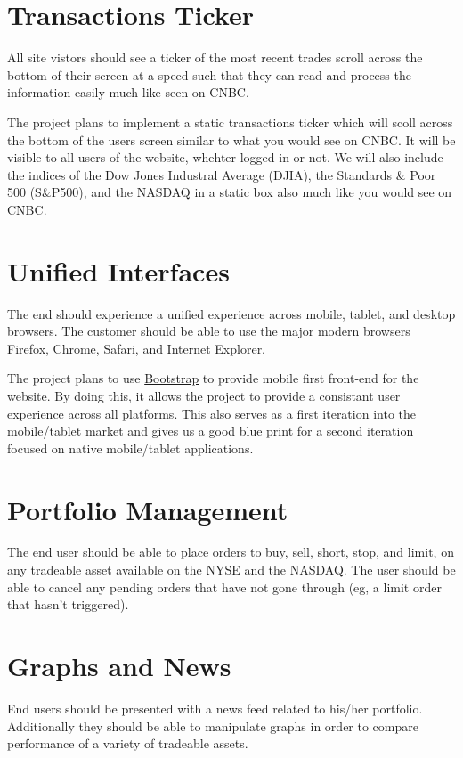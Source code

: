 \documentclass[11pt,letterpaper,oneside]{memoir}
\begin{document}
\section{Transactions Ticker}

All site vistors should see a ticker of the most recent trades scroll across the bottom of their
screen at a speed such that they can read and process the information easily much like seen on
CNBC.

The project plans to implement a static transactions ticker which will scoll across the bottom
of the users screen similar to what you would see on CNBC.  It will be visible to all users
of the website, whehter logged in or not.  We will also include the indices of the Dow Jones
Industral Average (DJIA), the Standards \& Poor 500 (S\&P500), and the NASDAQ in a static box
also much like you would see on CNBC.

\section{Unified Interfaces}

The end should experience a unified experience across mobile, tablet, and desktop browsers.
The customer should be able to use the major modern browsers Firefox, Chrome, Safari, and
Internet Explorer.

The project plans to use \href{http://getbootstrap.com}{Bootstrap} to provide mobile first
front-end for the website.  By doing this, it allows the project to provide a consistant
user experience across all platforms.  This also serves as a first iteration into the
mobile/tablet market and gives us a good blue print for a second iteration focused on
native mobile/tablet applications.

\section{Portfolio Management}

The end user should be able to place orders to buy, sell, short, stop, and limit, on any
tradeable asset available on the NYSE and the NASDAQ. The user should be able to
cancel any pending orders that have not gone through (eg, a limit order that hasn't triggered).

\section{Graphs and News}

End users should be presented with a news feed related to his/her portfolio.
Additionally they should be able to manipulate graphs in order to compare
performance of a variety of tradeable assets.
\end{document}
